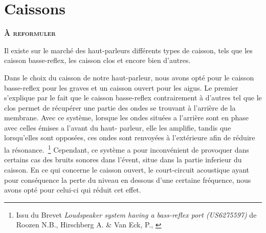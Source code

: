 \section{Caissons}

\textbf{\textsc{À reformuler}}

Il existe sur le marché des haut-parleurs
différents types de caisson, tels que
les caisson basse-reflex, les caisson clos et encore bien d’autres.

Dans le choix du caisson de notre haut-parleur,
nous avons opté pour le caisson basse-reflex pour les graves
et un caisson ouvert pour les aigus.
Le premier s’explique par le fait que le caisson basse-reflex
contrairement à d’autres tel que le clos permet de récupérer
une partie des ondes se trouvant à l’arrière de la membrane.
Avec ce système, lorsque les ondes situées a l’arrière sont en phase
avec celles émises a l’avant du haut- parleur, elle les amplifie,
tandis que lorsqu’elles  sont opposées,
ces ondes sont renvoyées à l’extérieure afin de réduire la résonance.~\footnote{Issu du Brevet \textit{\og Loudspeaker system having a bass-reflex port (US6275597)\fg} de Roozen N.B., Hirschberg A. & Van Eck, P., \cite{US6275597}}
Cependant, ce système a pour inconvénient de provoquer dans certains cas
des bruits sonores dans l’évent, situe dans la partie inferieur du caisson.
En ce qui concerne le caisson ouvert,
le court-circuit acoustique ayant pour conséquence la perte du niveau
en dessous d’une certaine fréquence,
nous avons opté pour celui-ci qui réduit cet effet.
